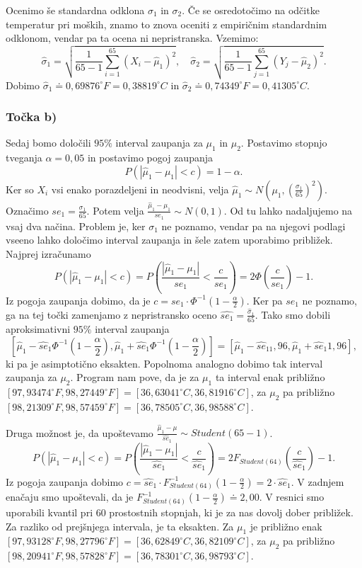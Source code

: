 \documentclass[12pt, letterpaper]{article}
\begin{document}
Ocenimo še standardna odklona $\sigma_1$ in $\sigma_2$. Če se osredotočimo na odčitke temperatur pri moških, znamo to znova oceniti z empiričnim standardnim odklonom, vendar pa ta ocena ni nepristranska. Vzemimo:
\[
\hat{\sigma}_1 = \sqrt{\frac{1}{65-1}\sum_{i=1}^{65}(X_i - \hat{\mu}_1)^2}, \quad \hat{\sigma}_2 = \sqrt{\frac{1}{65-1}\sum_{j=1}^{65}(Y_j - \hat{\mu}_2)^2}.
\]
Dobimo $\hat{\sigma}_1 \doteq 0,69876^{\circ}F = 0,38819^{\circ}C$ in $\hat{\sigma}_2 \doteq 0,74349^{\circ}F = 0,41305^{\circ}C$.
\subsubsection*{Točka b)} Sedaj bomo določili $95\%$ interval zaupanja za $\mu_1$ in $\mu_2$. Postavimo stopnjo tveganja $\alpha = 0,05$ in postavimo pogoj zaupanja
\[
P(|\hat{\mu}_1 - \mu_1| < c) = 1 - \alpha.
\]
Ker so $X_i$ vsi enako porazdeljeni in neodvisni, velja $\hat{\mu}_1 \sim N(\mu_1, (\frac{\sigma_1}{65})^2)$. Označimo $se_1 = \frac{\sigma_1}{65}$. Potem velja $\frac{\hat{\mu}_1 - \mu_1}{se_1} \sim N(0,1)$. Od tu lahko nadaljujemo na vsaj dva načina. Problem je, ker $\sigma_1$ ne poznamo, vendar pa na njegovi podlagi vseeno lahko določimo interval zaupanja in šele zatem uporabimo približek. Najprej izračunamo
\[
P(|\hat{\mu}_1 - \mu_1| < c) = P\left(\frac{|\hat{\mu}_1 - \mu_1|}{se_1} < \frac{c}{se_1}\right) = 2\Phi\left(\frac{c}{se_1}\right) - 1.
\]
Iz pogoja zaupanja dobimo, da je $c = se_1\cdot\Phi^{-1}(1 - \frac{\alpha}{2})$. Ker pa $se_1$ ne poznamo, ga na tej točki zamenjamo z nepristransko oceno $\hat{se_1} = \frac{\hat{\sigma}_1}{65}$.
Tako smo dobili aproksimativni $95\%$ interval zaupanja
\[\left[\hat{\mu}_1 - \hat{se}_1\Phi^{-1}\left(1 - \frac{\alpha}{2}\right),  \hat{\mu}_1 + \hat{se}_1\Phi^{-1}\left(1 - \frac{\alpha}{2}\right)\right] = \left[\hat{\mu}_1 - \hat{se}_11,96,  \hat{\mu}_1 + \hat{se}_1 1,96\right],\]
ki pa je asimptotično eksakten. Popolnoma analogno dobimo tak interval zaupanja za $\mu_2$. Program nam pove, da je za $\mu_1$ ta interval enak približno $[97,93474^{\circ}F, 98,27449^{\circ}F] = [36,63041^{\circ}C, 36,81916^{\circ}C]$, za $\mu_2$ pa približno $[98,21309^{\circ}F, 98,57459^{\circ}F] = [36,78505^{\circ}C, 36,98588^{\circ}C]$.

Druga možnost je, da upoštevamo $\frac{\hat{\mu}_1 - \mu}{\hat{se}_1} \sim Student(65-1)$.
\[
P(|\hat{\mu}_1 - \mu_1| < c) = P\left(\frac{|\hat{\mu}_1 - \mu_1|}{\hat{se}_1} < \frac{c}{\hat{se}_1}\right) = 2F_{Student(64)}\left(\frac{c}{\hat{se}_1}\right) - 1.
\]
Iz pogoja zaupanja dobimo $c = \hat{se}_1\cdot F^{-1}_{Student(64)}(1 - \frac{\alpha}{2}) = 2 \cdot\hat{se}_1$. V zadnjem enačaju smo upoštevali, da je $F^{-1}_{Student(64)}(1 - \frac{\alpha}{2}) \doteq 2,00$. V resnici smo uporabili kvantil pri $60$ prostostnih stopnjah, ki je za nas dovolj dober približek. Za razliko od prejšnjega intervala, je ta eksakten. Za $\mu_1$ je približno enak $[97,93128^{\circ}F, 98,27796^{\circ}F] = [36,62849^{\circ}C, 36,82109^{\circ}C]$, za $\mu_2$ pa približno $[98,20941^{\circ}F, 98,57828^{\circ}F] =[36,78301^{\circ}C, 36,98793^{\circ}C]$.
\end{document}
